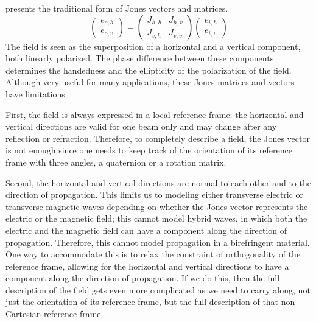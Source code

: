  presents the traditional form of Jones vectors and matrices.
\begin{equation}
    \begin{pmatrix}
        e_{o, h}\\
        e_{o, v}
    \end{pmatrix}
    =
    \begin{pmatrix}
        J_{h, h}   &   J_{h, v} \\
        J_{v, h}   &   J_{v, v}
    \end{pmatrix}
    \begin{pmatrix}
        e_{i, h}\\
        e_{i, v}
    \end{pmatrix}
    \label{eq:jones_matrix_2d}
\end{equation}
The field is seen as the superposition of a horizontal and a vertical component, both linearly polarized.
The phase difference between these components determines the handedness and the ellipticity of the polarization of the field.
Although very useful for many applications, these Jones matrices and vectors have limitations.

First, the field is always expressed in a local reference frame: the horizontal and vertical directions are valid for one beam only and may change after any reflection or refraction.
Therefore, to completely describe a field, the Jones vector is not enough since one needs to keep track of the orientation of its reference frame with three angles, a quaternion or a rotation matrix.

Second, the horizontal and vertical directions are normal to each other and to the direction of propagation.
This limits us to modeling either transverse electric or transverse magnetic waves depending on whether the Jones vector represents the electric or the magnetic field;
this cannot model hybrid waves, in which both the electric and the magnetic field can have a component along the direction of propagation.
Therefore, this cannot model propagation in a birefringent material.
One way to accommodate this is to relax the constraint of orthogonality of the reference frame, allowing for the horizontal and vertical directions to have a component along the direction of propagation.
If we do this, then the full description of the field gets even more complicated as we need to carry along, not just the orientation of its reference frame, but the full description of that non-Cartesian reference frame.

